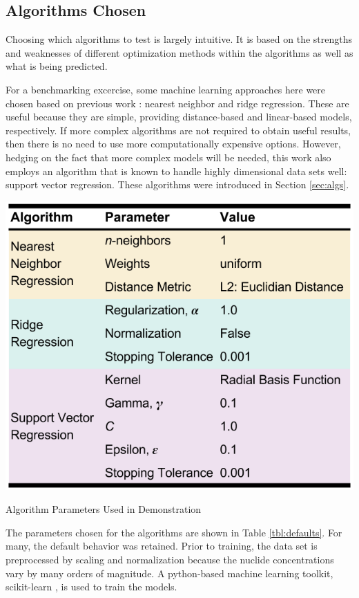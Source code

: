 \subsection{Algorithms Chosen}
\label{sec:choice}

Choosing which algorithms to test is largely intuitive. It is based on the
strengths and weaknesses of different optimization methods within the
algorithms as well as what is being predicted.  

For a benchmarking excercise, some machine learning approaches here were chosen
based on previous work \cite{dayman_feasibility_2013}: nearest neighbor and
ridge regression. These are useful because they are simple, providing distance-based and linear-based models, respectively. If
more complex algorithms are not required to obtain useful results, then there
is no need to use more computationally expensive options. However, hedging on
the fact that more complex models will be needed, this work also employs an
algorithm that is known to handle highly dimensional data sets well: support
vector regression. These algorithms were introduced in Section \ref{sec:algs}. 

\begin{table}[!htb]
  \centering
  \includegraphics[width=0.8\linewidth]{./chapters/demo_method/defaults.png}
  \caption{Algorithm Parameters Used in Demonstration}
  \label{tbl:defaults}
\end{table}

The parameters chosen for the algorithms are shown in Table \ref{tbl:defaults}.
For many, the default behavior was retained. Prior to training, the data set is
preprocessed by scaling and normalization because the nuclide concentrations
vary by many orders of magnitude. A python-based machine learning toolkit,
scikit-learn \cite{scikit}, is used to train the models.  

